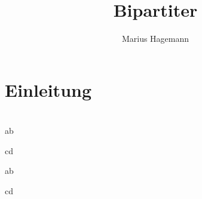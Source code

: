 \documentclass[a1,portrait]{a0poster}
\author{Marius Hagemann}
\title{Bipartiter \gc{}}
\begin{document}
\parindent0mm


\begin{multicols}{2}
	


\section{Einleitung}

\columnbreak




\section{}


\end{multicols}




\color{goetheblau}{\rule{\textwidth}{0.1cm}}




\begin{multicols}{2}

ab 

\columnbreak
{}
cd

\end{multicols}

\color{goetheblau}{\rule{\textwidth}{0.1cm}}




\begin{multicols}{2}

ab 

\columnbreak{}
cd
\end{multicols}
\end{document}
